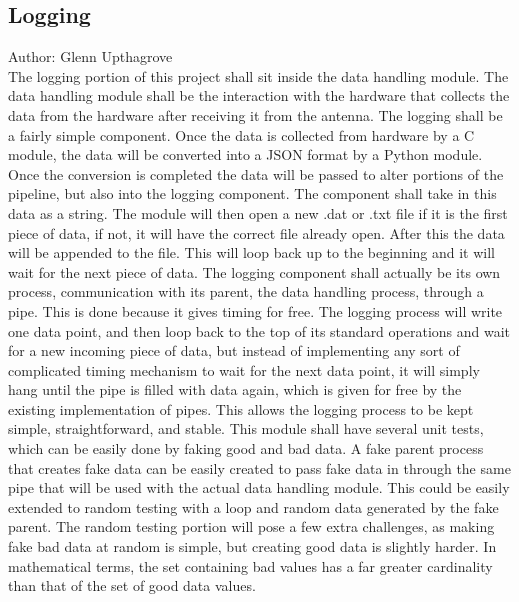 \documentclass[onecolumn, draftclsnofoot,10pt, compsoc]{IEEEtran}
\begin{document}
\subsection {Logging}
Author: Glenn Upthagrove \\
The logging portion of this project shall sit inside the data handling module. The data handling module shall be the interaction with the hardware that collects the data from the hardware after receiving it from the antenna. The logging shall be a fairly simple component. Once the data is collected from hardware by a C module, the data will be converted into a JSON format by a Python module. Once the conversion is completed the data will be passed to alter portions of the pipeline, but also into the logging component. The component shall take in this data as a string. The module will then open a new .dat or .txt file if it is the first piece of data, if not, it will have the correct file already open. After this the data will be appended to the file. This will loop back up to the beginning and it will wait for the next piece of data. The logging component shall actually be its own process, communication with its parent, the data handling process, through a pipe. This is done because it gives timing for free. The logging process will write one data point, and then loop back to the top of its standard operations and wait for a new incoming piece of data, but instead of implementing any sort of complicated timing mechanism to wait for the next data point, it will simply hang until the pipe is filled with data again, which is given for free by the existing implementation of pipes. This allows the logging process to be kept simple, straightforward, and stable. \cite{refjson} \cite{refpython} 
This module shall have several unit tests, which can be easily done by faking good and bad data. A fake parent process that creates fake data can be easily created to pass fake data in through the same pipe that will be used with the actual data handling module. This could be easily extended to random testing with a loop and random data generated by the fake parent. The random testing portion will pose a few extra challenges, as making fake bad data at random is simple, but creating good data is slightly harder. In mathematical terms, the set containing bad values has a far greater cardinality than that of the set of good data values. 
\end{document}
